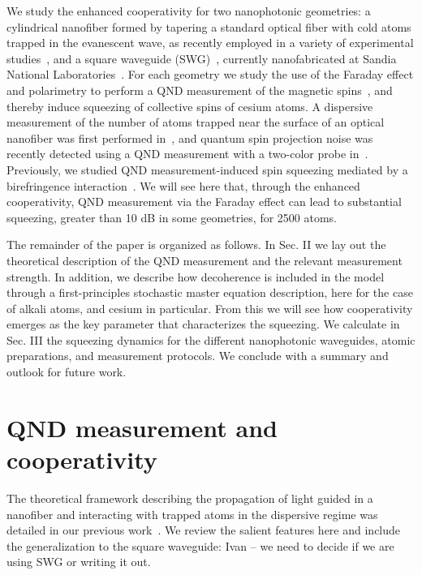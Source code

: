 \documentclass[preprint,aps,pra,onecolumn,superscriptaddress]{revtex4-1} %
\begin{document}
We study the enhanced cooperativity for two nanophotonic geometries: a cylindrical nanofiber formed by tapering a standard optical fiber with cold atoms trapped in the evanescent wave, as recently employed in a variety of experimental studies~\cite{Vetsch2010Optical, Goban2012, Reitz2013, Lee2015, Goban2014, Reitz2014, Volz2014Nonlinear, Beguin2014, Mitsch2014,Kato2015Strong, Sayrin2015, Sayrin2015a, Mitsch2014a, Solano2017Dynamics, Beguin2017Observation}, and a square waveguide (SWG)~\cite{Lee2013}, currently nanofabricated at Sandia National Laboratories~\cite{Lee2017Characterizations}.  For each geometry we study the use of the Faraday effect and polarimetry to perform a QND measurement of the magnetic spins~\cite{Smith2003a}, and thereby induce squeezing of collective spins of cesium atoms.  A dispersive measurement of the number of atoms trapped near the surface of an optical nanofiber was first performed in~\cite{Dawkins2011}, and quantum spin projection noise was recently detected using a QND measurement with a two-color probe in~\cite{Beguin2014, Beguin2017Observation}.  Previously, we studied QND measurement-induced spin squeezing  mediated by a birefringence interaction~\cite{Qi2016}. We will see here that, through the enhanced cooperativity, QND measurement via the Faraday effect can lead to substantial squeezing, greater than 10 dB in some geometries, for 2500 atoms.

The remainder of the paper is organized as follows.  In Sec. II we lay out the theoretical description of the QND measurement and the relevant measurement strength.  In addition, we describe how decoherence is included in the model through a first-principles stochastic master equation description, {\color{blue} here for the case of alkali atoms, and cesium in particular}.  From this we will see how cooperativity emerges as the key parameter that characterizes the squeezing.  We calculate in Sec. III the squeezing dynamics for the different nanophotonic waveguides, atomic preparations, and measurement protocols.  We conclude with a summary and outlook for future work.


\section{QND measurement and cooperativity} \label{Sec::QNDandCooperativityTheory}
The theoretical framework describing the propagation of light guided in a nanofiber and interacting with trapped atoms in the dispersive regime was detailed in our previous work~\cite{Qi2016}.  We review the salient features here and include the generalization to the {\color{red} square waveguide:  Ivan -- we need to decide if we are using SWG or writing it out.}
\end{document}
